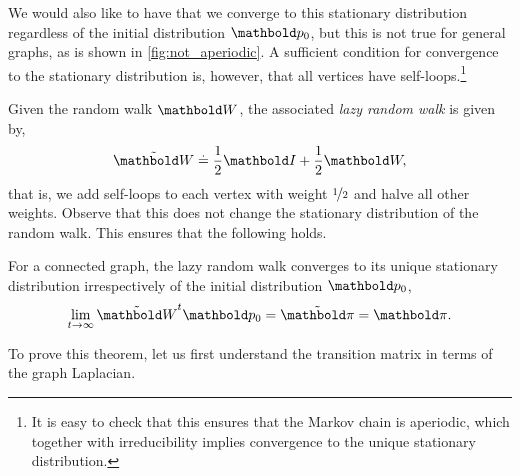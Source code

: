 We would also like to have that we converge to this stationary distribution regardless of the initial distribution $\vp_0$, but this is not true for general graphs, as is shown in \cref{fig:not_aperiodic}. A sufficient condition for convergence to the stationary distribution is, however, that all vertices have self-loops.\footnote{It is easy to check that this ensures that the Markov chain is aperiodic, which together with irreducibility implies convergence to the unique stationary distribution.}

Given the random walk $\mW$, the associated \emph{lazy random walk} is given by, \begin{align*}
    \Tilde{\mW} \defeq \frac{1}{2}\mI + \frac{1}{2}\mW,
\end{align*} that is, we add self-loops to each vertex with weight $\nicefrac{1}{2}$ and halve all other weights. Observe that this does not change the stationary distribution of the random walk. This ensures that the following holds.

\begin{thm}\label{thm:convergence_of_lazy_random_walk}
For a connected graph, the lazy random walk converges to its unique stationary distribution irrespectively of the initial distribution $\vp_0$, \begin{align}
    \lim_{t\to\infty} \Tilde{\mW}^t\vp_0 = \Tilde{\vpi} = \vpi.
\end{align}
\end{thm}

To prove this theorem, let us first understand the transition matrix in terms of the graph Laplacian.


